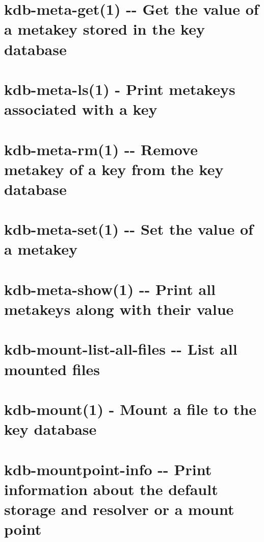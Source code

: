 \documentclass[twoside]{book}
\newcommand{\+}{\discretionary{\mbox{\scriptsize$\hookleftarrow$}}{}{}}
\begin{document}
\chapter{kdb-\/meta-\/get(1) -\/-\/ Get the value of a metakey stored in the key database}
\label{doc_help_kdb-meta-get_md}

\chapter{kdb-\/meta-\/ls(1) -\/ Print metakeys associated with a key}
\label{doc_help_kdb-meta-ls_md}

\chapter{kdb-\/meta-\/rm(1) -\/-\/ Remove metakey of a key from the key database}
\label{doc_help_kdb-meta-rm_md}

\chapter{kdb-\/meta-\/set(1) -\/-\/ Set the value of a metakey}
\label{doc_help_kdb-meta-set_md}

\chapter{kdb-\/meta-\/show(1) -\/-\/ Print all metakeys along with their value}
\label{doc_help_kdb-meta-show_md}

\chapter{kdb-\/mount-\/list-\/all-\/files -\/-\/ List all mounted files}
\label{doc_help_kdb-mount-list-all-files_md}

\chapter{kdb-\/mount(1) -\/ Mount a file to the key database}
\label{doc_help_kdb-mount_md}

\chapter{kdb-\/mountpoint-\/info -\/-\/ Print information about the default storage and resolver or a mount point}
\label{doc_help_kdb-mountpoint-info_md}

\end{document}
